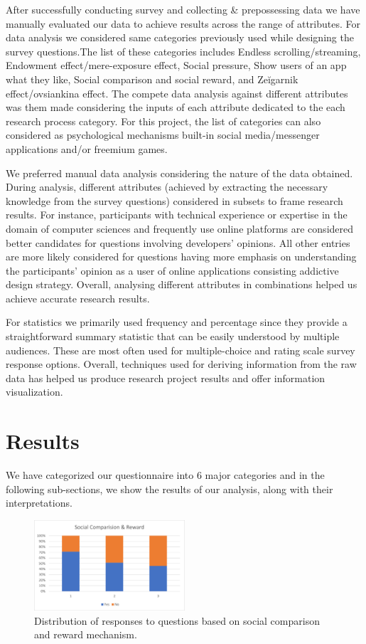 \documentclass[conference]{IEEEtran}
\begin{document}
After successfully conducting survey and collecting \& prepossessing data we have manually evaluated our data to achieve results across the range of attributes. For data analysis we considered same categories previously used while designing the survey questions.The list of these categories includes Endless scrolling/streaming, Endowment effect/mere-exposure effect, Social pressure, Show users of an app what they like, Social comparison and social reward, and Zeĭgarnik effect/ovsiankina effect. The compete data analysis against different attributes was them made considering the inputs of each attribute dedicated to the each research process category. For this project, the list of categories can also considered as psychological mechanisms built-in social media/messenger applications and/or freemium games.

We preferred manual data analysis considering the nature of the data obtained. During analysis, different attributes (achieved by extracting the necessary knowledge from the survey questions) considered in subsets to frame research results. For instance, participants with technical experience or expertise in the domain of computer sciences and frequently use online platforms are considered better candidates for questions involving developers' opinions. All other entries are more likely considered for questions having more emphasis on understanding the participants' opinion as a user of online applications consisting addictive design strategy. Overall, analysing different attributes in combinations helped us achieve accurate research results.   

For statistics we primarily used frequency and percentage since they provide a straightforward summary statistic that can be easily understood by multiple audiences. These are most often used for multiple-choice and rating scale survey response options. Overall, techniques used for deriving information from the raw data has helped us produce research project results and offer information visualization. 

\section{Results}
We have categorized our questionnaire into 6 major categories and in the following sub-sections, we show the results of our analysis, along with their interpretations.

\begin{figure}[htbp]
\centerline{\includegraphics[width=0.5\textwidth]{SR.png}}
\caption{Distribution of responses to questions based on social comparison and reward mechanism.}
\label{sr}
\end{figure}
\end{document}
